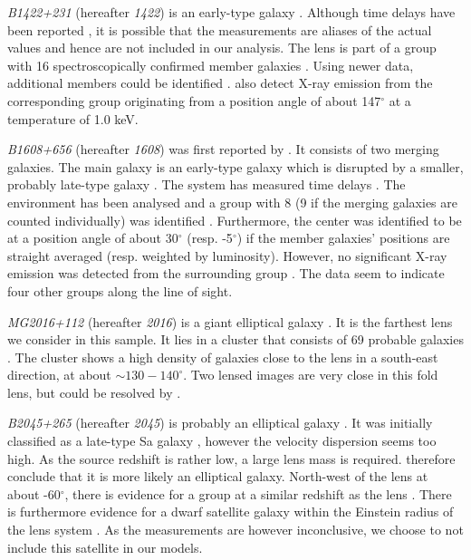 \documentclass[useAMS,usenatbib]{mn2e}
\begin{document}
\textit{B1422+231} (hereafter \textit{1422}) is an early-type galaxy \citep{1992MNRAS.259P...1P,1994AJ....107...28Y}. Although time delays have been reported \citep{2001MNRAS.326.1403P}, it is possible that the measurements are aliases of the actual values \citep{2003AJ....126...29R} and hence are not included in our analysis. The lens is part of a group with 16 spectroscopically confirmed member galaxies \citep{2006ApJ...641..169M}. Using newer data, additional members could be identified \citep{2011ApJ...726...84W}. \citet{2004ApJ...610..686G} also detect X-ray emission from the corresponding group originating from a position angle of about 147$^{\circ}$ at a temperature of 1.0 keV.

\textit{B1608+656} (hereafter \textit{1608}) was first reported by \citet{1995ApJ...447L...5M}. It consists of two merging galaxies. The main galaxy is an early-type galaxy which is disrupted by a smaller, probably late-type galaxy \citep{2003ApJ...584..100S}. The system has measured time delays \citep{2002ApJ...581..823F}. The environment has been analysed and a group with 8 (9 if the merging galaxies are counted individually) was identified \citep{2006ApJ...642...30F}. Furthermore, the center was identified to be at a position angle of about 30$^{\circ}$ (resp. -5$^{\circ}$) if the member galaxies' positions are straight averaged (resp. weighted by luminosity). However, no significant X-ray emission was detected from the surrounding group \citep{2005ApJ...625..633D}. The data seem to indicate four other groups along the line of sight.

\textit{MG2016+112} (hereafter \textit{2016}) is a giant elliptical galaxy \citep{1984Sci...223...46L,1986AJ.....91..991S}. It is the farthest lens we consider in this sample. It lies in a cluster that consists of 69 probable galaxies \citep{2003MNRAS.344..337T}. The cluster shows a high density of galaxies close to the lens in a south-east direction, at about $\sim130-140^{\circ}$. Two lensed images are very close in this fold lens, but could be resolved by \citet{2009MNRAS.394..174M}.

\textit{B2045+265} (hereafter \textit{2045}) is probably an elliptical galaxy \citep{2007MNRAS.378..109M}. It was initially classified as a late-type Sa galaxy \citep{1999AJ....117..658F}, however the velocity dispersion seems too high. As the source redshift is rather low, a large lens mass is required. \citet{2007MNRAS.378..109M} therefore conclude that it is more likely an elliptical galaxy. North-west of the lens at about -60$^{\circ}$, there is evidence for a group at a similar redshift as the lens \citep{1999AJ....117..658F}. There is furthermore evidence for a dwarf satellite galaxy within the Einstein radius of the lens system \citep{2007MNRAS.378..109M}. As the measurements are however inconclusive, we choose to not include this satellite in our models.
\end{document}
